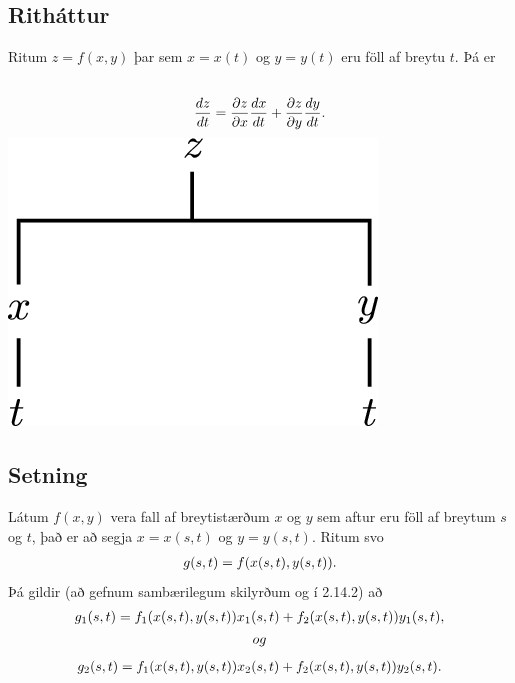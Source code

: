 \documentclass[a4paper,10pt,icelandic]{sphinxmanual}
\begin{document}
\subsection{Ritháttur}
\label{Kafli2:id16}
Ritum \(z=f(x,y)\) þar sem \(x=x(t)\) og \(y=y(t)\) eru föll
af breytu \(t\). Þá er
\begin{gather}
\begin{split}\displaystyle\end{split}\notag\\\begin{split}\frac{dz}{dt}=\frac{\partial z}{\partial x}\frac{dx}{dt}
+\frac{\partial z}{\partial y}\frac{dy}{dt}.\end{split}\notag
\end{gather}
{\hfill\includegraphics[width=0.270\linewidth]{chain1.png}\hfill}


\subsection{Setning}
\label{Kafli2:id17}
Látum \(f(x,y)\) vera fall af breytistærðum \(x\) og \(y\)
sem aftur eru föll af breytum \(s\) og \(t\), það er að segja
\(x=x(s,t)\) og \(y=y(s,t)\). Ritum svo
\begin{gather}
\begin{split}\displaystyle g(s,t)=f(x(s,t),y(s,t)).\end{split}\notag
\end{gather}
Þá gildir (að gefnum sambærilegum skilyrðum og í 2.14.2) að
\begin{gather}
\begin{split}\displaystyle g_1(s,t)=f_1(x(s,t),y(s,t))x_1(s,t)+f_2(x(s,t),y(s,t))y_1(s,t),\end{split}\notag\\\begin{split}og\end{split}\notag
\end{gather}\begin{gather}
\begin{split}\displaystyle g_2(s,t)=f_1(x(s,t),y(s,t))x_2(s,t)+f_2(x(s,t),y(s,t))y_2(s,t).\end{split}\notag
\end{gather}
\end{document}
